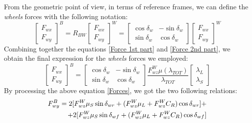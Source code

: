 \documentclass[a4paper,12pt,titlepage]{report}
\begin{document}
		From the geometric point of view, in terms of reference frames, we can define the \textit{wheels} forces with the following notation:
			\begin{equation} \label{Force 2nd part}
				\begin{bmatrix}
					F_{wx} \\
					F_{wy}
				\end{bmatrix}^{B} =	
				R_{BW}
				\begin{bmatrix}
					F_{wx} \\
					F_{wy}
				\end{bmatrix}^{W} =
				\begin{bmatrix}
					\cos\delta_{w} & -\sin\delta_{w} \\
					\sin\delta_{w} & \cos\delta_{w}
				\end{bmatrix}
				\begin{bmatrix}
					F_{wx} \\
					F_{wy}
				\end{bmatrix}^{W}
			\end{equation}
		Combining together the equations \ref{Force 1st part} and \ref{Force 2nd part}, we obtain the final expression for the \textit{wheels} forces we employed:
			\begin{equation} \label{Forces}
				\begin{bmatrix}
					F_{wx} \\
					F_{wy}
				\end{bmatrix}^{B} =	
				\begin{bmatrix}
					\cos\delta_{w} & -\sin\delta_{w} \\
					\sin\delta_{w} & \cos\delta_{w}
				\end{bmatrix}
				\frac{F_{wz}^{W} \mu(\lambda_{TOT})}{\lambda_{TOT}}
				\begin{bmatrix}
					\lambda_{L} \\
					\lambda_{S}
				\end{bmatrix}
			\end{equation}
		By processing the above equation \ref{Forces}, we got the two following relations:
			\begin{equation} \label{F_{wy}}
			\begin{split}
				F_{wy}^{B} = 2 [F_{wz}^{W} \mu_{S}\sin\delta_{wr} + (F_{wz}^{W} \mu_{L} + F_{wz}^{W} C_{R}) \cos\delta_{wr}] + \\ + 2 [F_{wz}^{W} \mu_{S}\sin\delta_{wf} + (F_{wz}^{W} \mu_{L} + F_{wz}^{W} C_{R})\cos\delta_{wf}] 
			\end{split}
			\end{equation}
\end{document}
